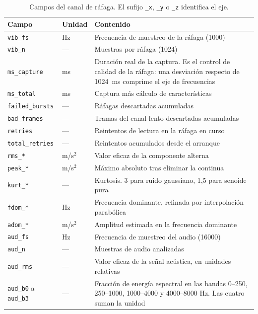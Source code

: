 \begin{table}[ht!]
\caption{Campos del canal de ráfaga. El sufijo \texttt{\_x}, \texttt{\_y} o \texttt{\_z}
identifica el eje.}
\label{table:rafaga}
\centering
\begin{tabular}{|p{2.6cm}|p{1.5cm}|p{8.3cm}|}
\hline
\textbf{Campo} & \textbf{Unidad} & \textbf{Contenido} \\
\hline
\texttt{vib\_fs} & Hz & Frecuencia de muestreo de la ráfaga (1000) \\
\hline
\texttt{vib\_n} & --- & Muestras por ráfaga (1024) \\
\hline
\texttt{ms\_capture} & ms & Duración real de la captura. Es el control de calidad de la
ráfaga: una desviación respecto de \mbox{1024 ms} comprime el eje de frecuencias \\
\hline
\texttt{ms\_total} & ms & Captura más cálculo de características \\
\hline
\texttt{failed\_bursts} & --- & Ráfagas descartadas acumuladas \\
\hline
\texttt{bad\_frames} & --- & Tramas del canal lento descartadas acumuladas \\
\hline
\texttt{retries} & --- & Reintentos de lectura en la ráfaga en curso \\
\hline
\texttt{total\_retries} & --- & Reintentos acumulados desde el arranque \\
\hline
\texttt{rms\_*} & m/s$^2$ & Valor eficaz de la componente alterna \\
\hline
\texttt{peak\_*} & m/s$^2$ & Máximo absoluto tras eliminar la continua \\
\hline
\texttt{kurt\_*} & --- & Kurtosis. 3 para ruido gaussiano, 1,5 para senoide pura \\
\hline
\texttt{fdom\_*} & Hz & Frecuencia dominante, refinada por interpolación parabólica \\
\hline
\texttt{adom\_*} & m/s$^2$ & Amplitud estimada en la frecuencia dominante \\
\hline
\texttt{aud\_fs} & Hz & Frecuencia de muestreo del audio (16000) \\
\hline
\texttt{aud\_n} & --- & Muestras de audio analizadas \\
\hline
\texttt{aud\_rms} & --- & Valor eficaz de la señal acústica, en unidades relativas \\
\hline
\texttt{aud\_b0} a \texttt{aud\_b3} & --- & Fracción de energía espectral en las bandas
0--250, 250--1000, 1000--4000 y 4000--8000 \mbox{Hz}. Las cuatro suman la unidad \\
\hline
\end{tabular}
\end{table}


